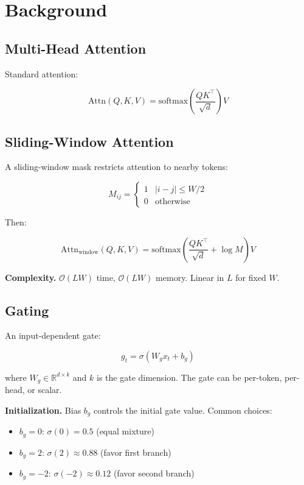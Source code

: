 
\section{Background}

\subsection{Multi-Head Attention}

Standard attention:

\[
\text{Attn}(Q, K, V) = \text{softmax}\!\left(\frac{QK^\top}{\sqrt{d}}\right)V
\tag{3.1}
\]

\subsection{Sliding-Window Attention}

A sliding-window mask restricts attention to nearby tokens:

\[
M_{ij} = \begin{cases} 1 & |i - j| \leq W/2 \\ 0 & \text{otherwise} \end{cases}
\tag{3.2}
\]

Then:

\[
\text{Attn}_\text{window}(Q, K, V) = \text{softmax}\!\left(\frac{QK^\top}{\sqrt{d}} + \log M\right)V
\tag{3.3}
\]

\textbf{Complexity.} $\mathcal{O}(L W)$ time, $\mathcal{O}(L W)$ memory. Linear 
in $L$ for fixed $W$.

\subsection{Gating}

An input-dependent gate:

\[
g_t = \sigma(W_g x_t + b_g)
\tag{3.4}
\]

where $W_g \in \mathbb{R}^{d \times k}$ and $k$ is the gate dimension. 
The gate can be per-token, per-head, or scalar.

\textbf{Initialization.} Bias $b_g$ controls the initial gate value. Common choices:
\begin{itemize}
\item $b_g = 0$: $\sigma(0) = 0.5$ (equal mixture)
\item $b_g = 2$: $\sigma(2) \approx 0.88$ (favor first branch)
\item $b_g = -2$: $\sigma(-2) \approx 0.12$ (favor second branch)

\end{itemize}
